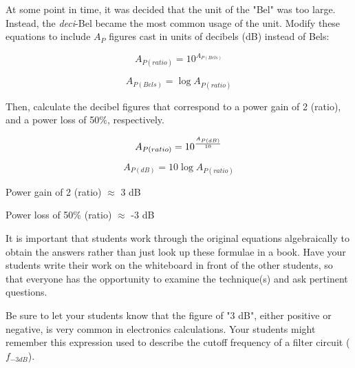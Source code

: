 

At some point in time, it was decided that the unit of the "Bel" was too large.  Instead, the {\it deci}-Bel became the most common usage of the unit.  Modify these equations to include $A_P$ figures cast in units of decibels (dB) instead of Bels:

$$A_{P(ratio)} = 10^{A_{P(Bels)}}$$

$$A_{P(Bels)} = \log A_{P(ratio)}$$

Then, calculate the decibel figures that correspond to a power gain of 2 (ratio), and a power loss of 50\%, respectively.







$$A_{P(ratio)} = 10^{A_{P(dB)} \over 10}$$

$$A_{P(dB)} = 10 \log A_{P(ratio)}$$

\vskip 10pt

Power gain of 2 (ratio) $\approx$ 3 dB

\vskip 10pt

Power loss of 50\% (ratio) $\approx$ -3 dB







It is important that students work through the original equations algebraically to obtain the answers rather than just look up these formulae in a book.  Have your students write their work on the whiteboard in front of the other students, so that everyone has the opportunity to examine the technique(s) and ask pertinent questions.

Be sure to let your students know that the figure of "3 dB", either positive or negative, is very common in electronics calculations.  Your students might remember this expression used to describe the cutoff frequency of a filter circuit ($f_{-3 dB}$).




